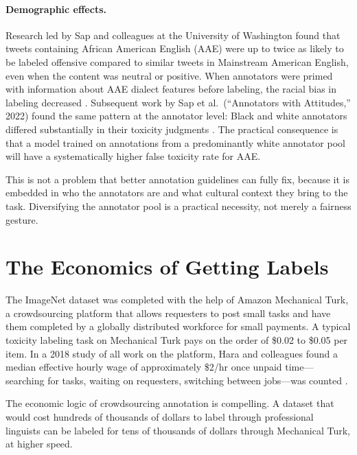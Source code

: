 \paragraph{Demographic effects.} Research led by Sap and colleagues at the University of Washington found that tweets containing African American English (AAE) were up to twice as likely to be labeled offensive compared to similar tweets in Mainstream American English, even when the content was neutral or positive. When annotators were primed with information about AAE dialect features before labeling, the racial bias in labeling decreased \autocite{sap2019risk}. Subsequent work by Sap et al.\ (``Annotators with Attitudes,'' 2022) found the same pattern at the annotator level: Black and white annotators differed substantially in their toxicity judgments \autocite{sap2022annotators}. The practical consequence is that a model trained on annotations from a predominantly white annotator pool will have a systematically higher false toxicity rate for AAE.

\begin{cautionbox}
This is not a problem that better annotation guidelines can fully fix, because it is embedded in who the annotators are and what cultural context they bring to the task. Diversifying the annotator pool is a practical necessity, not merely a fairness gesture.
\end{cautionbox}

\section{The Economics of Getting Labels}
\label{sec:ch7-economics}

The ImageNet dataset was completed with the help of Amazon Mechanical Turk, a crowdsourcing platform that allows requesters to post small tasks and have them completed by a globally distributed workforce for small payments. A typical toxicity labeling task on Mechanical Turk pays on the order of \$0.02 to \$0.05 per item. In a 2018 study of all work on the platform, Hara and colleagues found a median effective hourly wage of approximately \$2/hr once unpaid time---searching for tasks, waiting on requesters, switching between jobs---was counted \autocite{hara2018data}.

The economic logic of crowdsourcing annotation is compelling. A dataset that would cost hundreds of thousands of dollars to label through professional linguists can be labeled for tens of thousands of dollars through Mechanical Turk, at higher speed.

